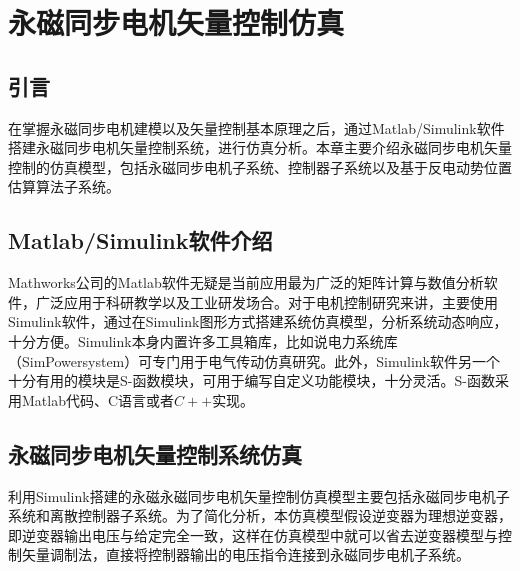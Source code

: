 \chapter{永磁同步电机矢量控制仿真}
\section{引言}
在掌握永磁同步电机建模以及矢量控制基本原理之后，通过Matlab/Simulink软件搭建永磁同步电机矢量控制系统，进行仿真分析。本章主要介绍永磁同步电机矢量控制的仿真模型，包括永磁同步电机子系统、控制器子系统以及基于反电动势位置估算算法子系统。
\section{Matlab/Simulink软件介绍}
Mathworks公司的Matlab软件无疑是当前应用最为广泛的矩阵计算与数值分析软件，广泛应用于科研教学以及工业研发场合。对于电机控制研究来讲，主要使用Simulink软件，通过在Simulink图形方式搭建系统仿真模型，分析系统动态响应，十分方便。Simulink本身内置许多工具箱库，比如说电力系统库（SimPowersystem）可专门用于电气传动仿真研究。此外，Simulink软件另一个十分有用的模块是S-函数模块，可用于编写自定义功能模块，十分灵活。S-函数采用Matlab代码、C语言或者$C++$实现。
\section{永磁同步电机矢量控制系统仿真}
利用Simulink搭建的永磁永磁同步电机矢量控制仿真模型主要包括永磁同步电机子系统和离散控制器子系统。为了简化分析，本仿真模型假设逆变器为理想逆变器，即逆变器输出电压与给定完全一致，这样在仿真模型中就可以省去逆变器模型与控制矢量调制法，直接将控制器输出的电压指令连接到永磁同步电机子系统。

